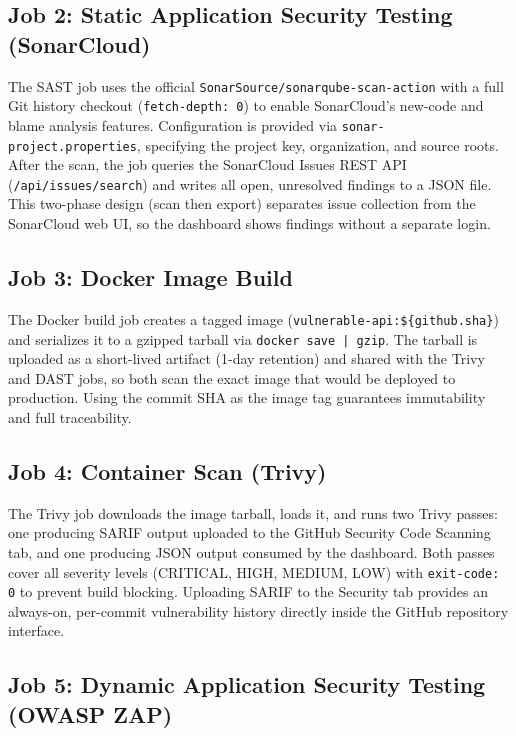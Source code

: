 \documentclass[10pt,conference]{IEEEtran}
\begin{document}
\subsection{Job 2: Static Application Security Testing (SonarCloud)}

The SAST job uses the official \texttt{SonarSource/sonarqube-scan-action}
with a full Git history checkout (\texttt{fetch-depth: 0}) to enable
SonarCloud's new-code and blame analysis features.
Configuration is provided via \texttt{sonar-project.properties}, specifying
the project key, organization, and source roots.
After the scan, the job queries the SonarCloud Issues REST API
(\texttt{/api/issues/search}) and writes all open, unresolved findings to
a JSON file.
This two-phase design (scan then export) separates issue collection from the
SonarCloud web UI, so the dashboard shows findings without a separate login.

\subsection{Job 3: Docker Image Build}

The Docker build job creates a tagged image
(\texttt{vulnerable-api:\$\{github.sha\}}) and serializes it to a gzipped
tarball via \texttt{docker save | gzip}.
The tarball is uploaded as a short-lived artifact (1-day retention) and
shared with the Trivy and DAST jobs, so both scan the exact image that
would be deployed to production.
Using the commit SHA as the image tag guarantees immutability and full
traceability.

\subsection{Job 4: Container Scan (Trivy)}

The Trivy job downloads the image tarball, loads it, and runs two Trivy
passes: one producing SARIF output uploaded to the GitHub Security
Code Scanning tab, and one producing JSON output consumed by the dashboard.
Both passes cover all severity levels (CRITICAL, HIGH, MEDIUM, LOW) with
\texttt{exit-code: 0} to prevent build blocking.
Uploading SARIF to the Security tab provides an always-on, per-commit
vulnerability history directly inside the GitHub repository interface.

\subsection{Job 5: Dynamic Application Security Testing (OWASP ZAP)}
\end{document}
